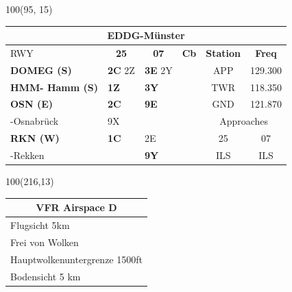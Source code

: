 \documentclass[10pt,landscape,a4paper]{article}
\begin{document}
\begin{textblock}{100}(95, 15)
\begin{table}[]
\begin{tabular}{|llllll}
\multicolumn{6}{c}{\textbf{EDDG-Münster}} \\ \hline
\multicolumn{1}{|l|}{RWY} 									& \multicolumn{1}{c|}{\textbf{25}} 				& \multicolumn{1}{c|}{\textbf{07}}  				& \multicolumn{1}{c|}{\textbf{Cb}} 						& \multicolumn{1}{c|}{\textbf{Station}} 	& \multicolumn{1}{c|}{\textbf{Freq}}\\ \hline
\multicolumn{1}{|l|}{\textbf{DOMEG (S)}}							& \multicolumn{1}{l|}{\textbf{2C} 2Z}				& \multicolumn{1}{l|}{\textbf{3E} 2Y} 				& \multicolumn{1}{c|}{\multirow{6}{*}{\rotatebox{90}{5000ft}}}		& \multicolumn{1}{c|}{APP}		& \multicolumn{1}{c|}{129.300}\\
\multicolumn{1}{|l|}{\textbf{HMM- Hamm (S)}}						& \multicolumn{1}{l|}{\textbf{1Z}}				& \multicolumn{1}{l|}{\textbf{3Y}}				& \multicolumn{1}{c|}{}  								& \multicolumn{1}{c|}{TWR}		& \multicolumn{1}{c|}{118.350} \\ \cline{1-3}

\multicolumn{1}{|l|}{\textbf{OSN (E)}} 								& \multicolumn{1}{l|}{\textbf{2C} } 				& \multicolumn{1}{l|}{\textbf{9E}}				& \multicolumn{1}{c|}{} 								& \multicolumn{1}{c|}{GND} 		& \multicolumn{1}{c|}{121.870} \\ \cline{5-6}
\multicolumn{1}{|l|}{-Osnabrück}								& \multicolumn{1}{l|}{9X}						& \multicolumn{1}{l|}{}						& \multicolumn{1}{c|}{} 								& \multicolumn{2}{c|}{Approaches}						\\ \hline

\multicolumn{1}{|l|}{\textbf{RKN (W)}} 							& \multicolumn{1}{l|}{\textbf{1C}}				& \multicolumn{1}{l|}{2E}						& \multicolumn{1}{c|}{}								& \multicolumn{1}{c|}{25}& \multicolumn{1}{c|}{07} 				\\
\multicolumn{1}{|l|}{-Rekken} 									& \multicolumn{1}{l|}{\textbf{}} 					& \multicolumn{1}{l|}{\textbf{9Y}}				& \multicolumn{1}{c|}{}  								& \multicolumn{1}{c|}{ILS}& \multicolumn{1}{c|}{ILS}\\ \hline
\end{tabular}
\end{table}
\end{textblock}






\begin{textblock}{100}(216,13)
\begin{table}[]
\begin{tabular}{|l|}
\multicolumn{1}{c}{\textbf{VFR Airspace D}} \\ \hline
 Flugsicht 5km   \\ \hline
Frei von Wolken   \\ \hline
Hauptwolkenuntergrenze 1500ft \\ \hline
Bodensicht 5 km \\ \hline
\end{tabular}
\end{table}
\end{textblock}
\end{document}
